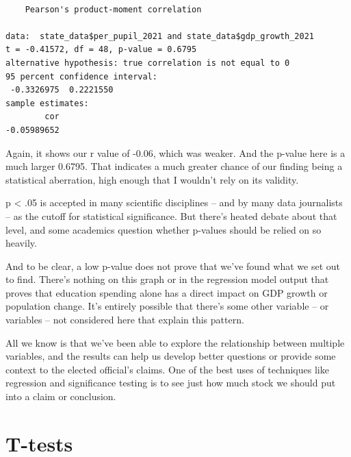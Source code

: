 \documentclass[
  letterpaper,
  DIV=11,
  numbers=noendperiod]{scrreprt}
\newenvironment{Shaded}{\begin{snugshade}}{\end{snugshade}}
\newcommand{\FunctionTok}[1]{\textcolor[rgb]{0.28,0.35,0.67}{#1}}
\newcommand{\NormalTok}[1]{\textcolor[rgb]{0.00,0.23,0.31}{#1}}
\newcommand{\SpecialCharTok}[1]{\textcolor[rgb]{0.37,0.37,0.37}{#1}}
\begin{document}
\begin{Shaded}
\end{Shaded}

\begin{verbatim}

    Pearson's product-moment correlation

data:  state_data$per_pupil_2021 and state_data$gdp_growth_2021
t = -0.41572, df = 48, p-value = 0.6795
alternative hypothesis: true correlation is not equal to 0
95 percent confidence interval:
 -0.3326975  0.2221550
sample estimates:
        cor 
-0.05989652 
\end{verbatim}

Again, it shows our r value of -0.06, which was weaker. And the p-value
here is a much larger 0.6795. That indicates a much greater chance of
our finding being a statistical aberration, high enough that I wouldn't
rely on its validity.

p \textless{} .05 is accepted in many scientific disciplines -- and by
many data journalists -- as the cutoff for statistical significance. But
there's heated debate about that level, and some academics question
whether p-values should be relied on so heavily.

And to be clear, a low p-value does not prove that we've found what we
set out to find. There's nothing on this graph or in the regression
model output that proves that education spending alone has a direct
impact on GDP growth or population change. It's entirely possible that
there's some other variable -- or variables -- not considered here that
explain this pattern.

All we know is that we've been able to explore the relationship between
multiple variables, and the results can help us develop better questions
or provide some context to the elected official's claims. One of the
best uses of techniques like regression and significance testing is to
see just how much stock we should put into a claim or conclusion.


\hypertarget{t-tests}{%
\chapter{T-tests}\label{t-tests}}
\end{document}
